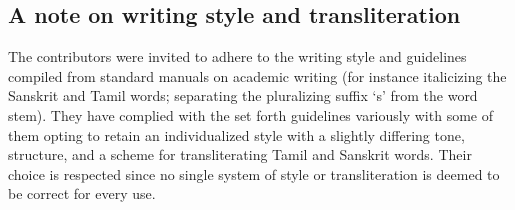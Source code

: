 \subsection*{A note on writing style and transliteration}

\vskip -6pt

The contributors were invited to adhere to the writing style and guidelines compiled from standard manuals on academic writing (for instance italicizing the Sanskrit and Tamil words; separating the pluralizing suffix ‘s’ from the word stem). They have complied with the set forth guidelines variously with some of them opting to retain an individualized style with a slightly differing tone, structure, and a scheme for transliterating Tamil and Sanskrit words. Their choice is respected since no single system of style or transliteration is deemed to be correct for every use.

